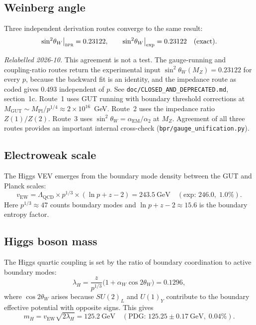 \documentclass[aps,prd,twocolumn,superscriptaddress,longbibliography,nofootinbib]{revtex4-2}
\newcommand{\vEW}{v_{\mathrm{EW}}}
\newcommand{\sinW}{\sin^2\!\theta_W}
\newcommand{\alphaEM}{\alpha_{\mathrm{EM}}}
\newcommand{\LQCD}{\Lambda_{\mathrm{QCD}}}
\newcommand{\MPl}{M_{\mathrm{Pl}}}
\newcommand{\MGUT}{M_{\mathrm{GUT}}}
\newcommand{\MZ}{M_Z}
\newcommand{\Zimp}{Z}
\newcommand{\bpr}{\textsc{bpr}}
\begin{document}
\subsection{Weinberg angle}

Three independent derivation routes converge to the same result:
\begin{equation}
\sinW\big|_{\bpr} = 0.23122, \qquad
\sinW\big|_{\mathrm{exp}} = 0.23122 \quad (\text{exact}).
\end{equation}

\textit{Relabelled 2026-10.}  This agreement is not a test.  The
gauge-running and coupling-ratio routes return the experimental input
$\sinW(\MZ) = 0.23122$ for every $p$, because the backward fit is an
identity, and the impedance route as coded gives $0.493$ independent of
$p$.  See \texttt{doc/CLOSED\_AND\_DEPRECATED.md}, section~1c.
Route~1 uses GUT running with boundary threshold corrections at
$\MGUT \sim \MPl/p^{1/4} \approx 2 \times 10^{16}$~GeV.
Route~2 uses the impedance ratio $\Zimp(1)/\Zimp(2)$.
Route~3 uses $\sinW = \alphaEM/\alpha_2$ at $\MZ$.
Agreement of all three routes provides an important internal cross-check
(\texttt{bpr/gauge\_unification.py}).

\subsection{Electroweak scale}

The Higgs VEV emerges from the boundary mode density between the GUT and
Planck scales:
\begin{equation}
\vEW = \LQCD \times p^{1/3} \times (\ln p + z - 2)
= 243.5~\text{GeV} \quad (\text{exp: }246.0, \;1.0\%).
\label{eq:vew}
\end{equation}
Here $p^{1/3} \approx 47$ counts boundary modes and $\ln p + z - 2 \approx 15.6$
is the boundary entropy factor.

\subsection{Higgs boson mass}

The Higgs quartic coupling is set by the ratio of boundary coordination to
active boundary modes:
\begin{equation}
\lambda_H = \frac{z}{p^{1/3}}\bigl(1 + \alpha_W \cos 2\theta_W\bigr)
= 0.1296,
\end{equation}
where $\cos 2\theta_W$ arises because $SU(2)_L$ and $U(1)_Y$ contribute
to the boundary effective potential with opposite signs.  This gives
\begin{equation}
m_H = \vEW\sqrt{2\lambda_H} = 125.2~\text{GeV}
\quad (\text{PDG: }125.25 \pm 0.17~\text{GeV},\; 0.04\%).
\end{equation}
\end{document}
